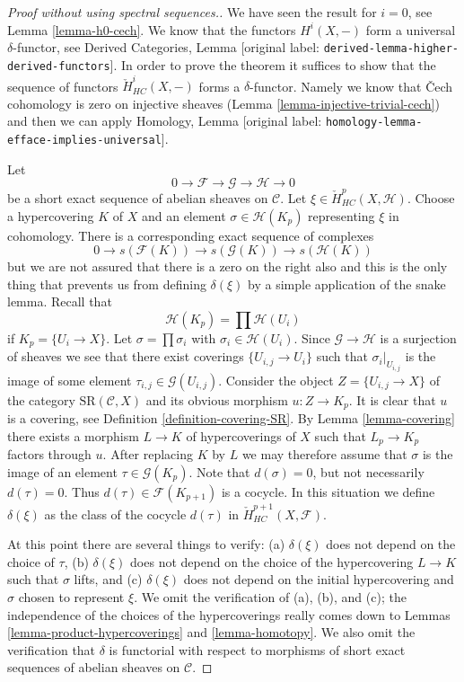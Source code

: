 \documentclass[10pt,a4paper]{article}
\theoremstyle{plain}
\theoremstyle{definition}
\theoremstyle{remark}
\numberwithin{equation}{subsection}
\begin{document}
\begin{proof}[Proof without using spectral sequences.]
We have seen the result for $i = 0$, see Lemma \ref{lemma-h0-cech}.
We know that the functors $H^i(X, -)$ form a universal $\delta$-functor, see
Derived Categories, Lemma \textnormal{[original label: \nolinkurl{derived-lemma-higher-derived-functors}]}.
In order to prove the theorem it suffices to show that
the sequence of functors $\check{H}^i_{HC}(X, -)$ forms a
$\delta$-functor. Namely we know that {\v C}ech cohomology
is zero on injective sheaves (Lemma \ref{lemma-injective-trivial-cech})
and then we can apply
Homology, Lemma \textnormal{[original label: \nolinkurl{homology-lemma-efface-implies-universal}]}.

\medskip\noindent
Let
$$
0 \to \mathcal{F} \to \mathcal{G} \to \mathcal{H} \to 0
$$
be a short exact sequence of abelian sheaves on $\mathcal{C}$.
Let $\xi \in \check{H}^p_{HC}(X, \mathcal{H})$. Choose a hypercovering
$K$ of $X$ and an element $\sigma \in \mathcal{H}(K_p)$ representing
$\xi$ in cohomology. There is a corresponding exact sequence of
complexes
$$
0 \to s(\mathcal{F}(K)) \to s(\mathcal{G}(K)) \to s(\mathcal{H}(K))
$$
but we are not assured that there is a zero on the right also and this
is the only thing that
prevents us from defining $\delta(\xi)$ by a simple application of the
snake lemma. Recall that
$$
\mathcal{H}(K_p) = \prod \mathcal{H}(U_i)
$$
if $K_p = \{U_i \to X\}$. Let $\sigma =\prod \sigma_i$ with
$\sigma_i \in \mathcal{H}(U_i)$. Since $\mathcal{G} \to \mathcal{H}$ is
a surjection of sheaves we see that there exist coverings
$\{U_{i, j} \to U_i\}$ such that $\sigma_i|_{U_{i, j}}$ is the
image of some element $\tau_{i, j} \in \mathcal{G}(U_{i, j})$.
Consider the object $Z = \{U_{i, j} \to X\}$ of the category
$\text{SR}(\mathcal{C}, X)$ and its obvious morphism
$u : Z \to K_p$. It is clear that $u$ is a covering, see
Definition \ref{definition-covering-SR}. By
Lemma \ref{lemma-covering} there
exists a morphism $L \to K$ of hypercoverings of $X$ such that
$L_p \to K_p$ factors through $u$. After replacing $K$ by $L$
we may therefore assume that $\sigma$ is the image of an
element $\tau \in \mathcal{G}(K_p)$. Note that $d(\sigma) = 0$,
but not necessarily $d(\tau) = 0$. Thus $d(\tau) \in \mathcal{F}(K_{p + 1})$
is a cocycle. In this situation we define
$\delta(\xi)$ as the class of the cocycle $d(\tau)$ in
$\check{H}^{p + 1}_{HC}(X, \mathcal{F})$.

\medskip\noindent
At this point there are several things to verify:
(a) $\delta(\xi)$ does not depend on the choice of $\tau$,
(b) $\delta(\xi)$ does not depend on the choice of the hypercovering
$L \to K$ such that $\sigma$ lifts, and
(c) $\delta(\xi)$ does not depend on the initial hypercovering and
$\sigma$ chosen to represent $\xi$. We omit the verification of
(a), (b), and (c); the independence of the choices of the hypercoverings
really comes down to Lemmas \ref{lemma-product-hypercoverings}
and \ref{lemma-homotopy}. We also omit the verification that
$\delta$ is functorial with respect to morphisms of short exact
sequences of abelian sheaves on $\mathcal{C}$.


\end{proof}
\end{document}
